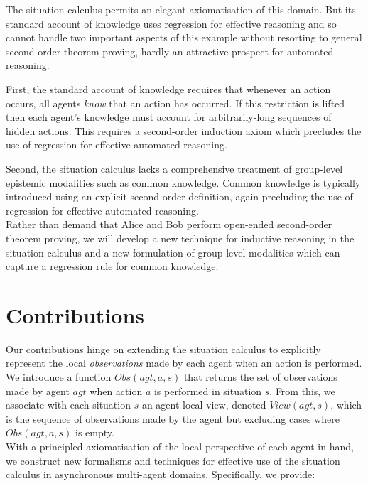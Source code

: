 The situation calculus permits an elegant axiomatisation of this domain.
But its standard account of knowledge uses regression for effective
reasoning and so cannot handle two important aspects of this example
without resorting to general second-order theorem proving, hardly
an attractive prospect for automated reasoning.

First, the standard account of knowledge requires that whenever an
action occurs, all agents \emph{know} that an action has occurred.
If this restriction is lifted then each agent's knowledge must account
for arbitrarily-long sequences of hidden actions. This requires a
second-order induction axiom which precludes the use of regression
for effective automated reasoning.

Second, the situation calculus lacks a comprehensive treatment of group-level
epistemic modalities such as common knowledge. Common knowledge is
typically introduced using an explicit second-order definition, again
precluding the use of regression for effective automated reasoning.\\


Rather than demand that Alice and Bob perform open-ended second-order
theorem proving, we will develop a new technique for inductive reasoning
in the situation calculus and a new formulation of group-level modalities
which can capture a regression rule for common knowledge.

\newpage{}


\section{Contributions}

Our contributions hinge on extending the situation calculus to explicitly
represent the local \emph{observations} made by each agent when an
action is performed. We introduce a function $Obs(agt,a,s)$ that
returns the set of observations made by agent $agt$ when action $a$
is performed in situation $s$. From this, we associate with each
situation $s$ an agent-local view, denoted $View(agt,s)$, which
is the sequence of observations made by the agent but excluding cases
where $Obs(agt,a,s)$ is empty.\\


With a principled axiomatisation of the local perspective of each
agent in hand, we construct new formalisms and techniques for effective
use of the situation calculus in asynchronous multi-agent domains.
Specifically, we provide:

